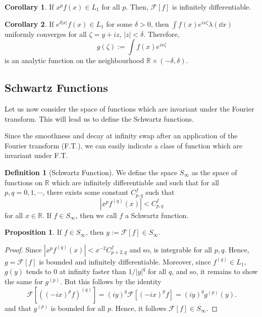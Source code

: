 \documentclass[]{article}
\theoremstyle{definition}
\newtheorem{corollary}{Corollary}[theorem]
\theoremstyle{definition}
\newtheorem{definition}{Definition}[section]
\newtheorem{proposition}{Proposition}[section]
\begin{document}
\begin{corollary}
  If \(x^pf(x) \in L_1\) for all \(p\). Then, \(\mathcal{F}[f]\) is infinitely 
  differentiable. 
\end{corollary}

\begin{corollary}
  If \(e^{\delta |x|}f(x) \in L_1\) for some \(\delta > 0\), then 
  \(\int f(x)e^{ix \zeta} \lambda(\dd x)\) uniformly converges for all 
  \(\zeta = y + iz\), \(|z| < \delta\). Therefore, 
  \[g(\zeta) := \int f(x) e^{ix\zeta}\]
  is an analytic function on the neighbourhood \(\mathbb{R} \times (-\delta, \delta)\).
\end{corollary}

\subsection{Schwartz Functions}

Let us now consider the space of functions which are invariant under the Fourier 
transform. This will lead us to define the Schwartz functions.

Since the smoothness and decay at infinity swap after an application of the Fourier 
transform (F.T.), we can easily indicate a class of function which are invariant 
under F.T.

\begin{definition}[Schwartz Function]
  We define the space \(S_\infty\) as the space of functions on \(\mathbb{R}\) 
  which are infinitely differentiable and such that for all \(p, q = 0, 1, \cdots\), 
  there exists some constant \(C_{p, q}^f\) such that 
  \[|x^p f^{(q)}(x)| < C_{p, q}^f\]
  for all \(x \in \mathbb{R}\). If \(f \in S_\infty\), then we call \(f\) a Schwartz 
  function.
\end{definition}

\begin{proposition}
   If \(f \in S_\infty\), then \(g := \mathcal{F}[f] \in S_\infty\).
\end{proposition}
\begin{proof}
  Since \(|x^pf^{(q)}(x)| < x^{-2} C_{p + 2, q}^f\) and so, is integrable 
  for all \(p, q\). Hence, \(g = \mathcal{F}[f]\) is bounded and infinitely differentiable.
  Moreover, since \(f^{(q)} \in L_1\), \(g(y)\) tends to 0 at infinity faster 
  than \(1 / |y|^q\) for all \(q\), and so, it remains to show the same for \(g^{(p)}\). 
  But this follows by the identity 
  \[\mathcal{F}[((-ix)^p f)^{(q)}] = (i y)^q \mathcal{F}[(-ix)^p f] = 
    (iy)^q g^{(p)}(y).\]
  and that \(g^{(p)}\) is bounded for all \(p\). Hence, it follows \(\mathcal{F}[f] \in S_\infty\).
\end{proof}
\end{document}

